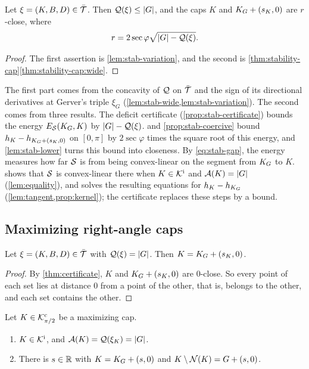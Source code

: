 \begin{theorem}\label{thm:certificate}
Let $\xi=(K,B,D)\in\bar{\mathcal{T}}$. Then $\mathcal{Q}(\xi)\le\lvert G\rvert$, and the caps $K$ and
$K_G+(s_K,0)$ are $r$-close, where
\[
  r=2\sec\varphi\sqrt{\lvert G\rvert-\mathcal{Q}(\xi)}.
\]
\end{theorem}

\begin{proof}
The first assertion is \cref{lem:stab-variation}, and the second is
\cref{thm:stability-cap}\ref{thm:stability-cap:wide}.
\end{proof}

The first part comes from the concavity of $\mathcal{Q}$ on $\bar{\mathcal{T}}$ and the sign of
its directional derivatives at Gerver's triple $\xi_G$
(\cref{lem:stab-wide,lem:stab-variation}). The second comes from three results.
The deficit certificate (\cref{prop:stab-certificate}) bounds the energy
$E_{\mathcal{S}}(K_G,K)$ by $\lvert G\rvert-\mathcal{Q}(\xi)$.  and
\cref{prop:stab-coercive} bound
$h_K-h_{K_G+(s_K,0)}$ on $[0,\pi]$ by $2\sec\varphi$ times the square root of
this energy, and \cref{lem:stab-lower} turns this bound into closeness. By
\eqref{eq:stab-gap}, the energy measures how far $\mathcal{S}$ is from being
convex-linear on the segment from $K_G$ to $K$.  shows that
$\mathcal{S}$ is convex-linear there when $K\in\mathcal{K}^{\mathrm{i}}$ and $\mathcal{A}(K)=\lvert G\rvert$
(\cref{lem:equality}), and solves the resulting equations for $h_K-h_{K_G}$
(\cref{lem:tangent,prop:kernel}); the certificate replaces these steps by a
bound.

\subsection{Maximizing right-angle caps}\label{sec:unified-caps}

\begin{lemma}\label{lem:zero-deficit}
Let $\xi=(K,B,D)\in\bar{\mathcal{T}}$ with $\mathcal{Q}(\xi)=\lvert G\rvert$. Then $K=K_G+(s_K,0)$.
\end{lemma}

\begin{proof}
By \cref{thm:certificate}, $K$ and $K_G+(s_K,0)$ are $0$-close. So every point
of each set lies at distance $0$ from a point of the other, that is, belongs to
the other, and each set contains the other.
\end{proof}

\begin{proposition}\label{prop:unified-caps}
Let $K\in\mathcal{K}^{\mathrm{c}}_{\pi/2}$ be a maximizing cap.
\begin{enumerate}[label=(\alph*)]
\item\label{prop:unified-caps:value} $K\in\mathcal{K}^{\mathrm{i}}$, and
$\mathcal{A}(K)=\mathcal{Q}(\xi_K)=\lvert G\rvert$.
\item\label{prop:unified-caps:shape} There is $s\in\mathbb{R}$ with $K=K_G+(s,0)$ and
$K\setminus\mathcal{N}(K)=G+(s,0)$.
\end{enumerate}
\end{proposition}

